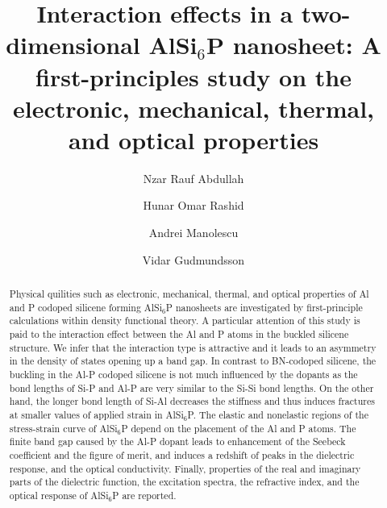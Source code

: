 \documentclass[5p,twocolumn]{elsarticle}
\begin{document}
\begin{frontmatter}




\title{Interaction effects in a two-dimensional AlSi$_6$P nanosheet: A first-principles study on the electronic, mechanical, thermal, and optical properties}
	


\author[a1,a2]{Nzar Rauf Abdullah}
\address[a1]{Division of Computational Nanoscience, Physics Department, College of Science, University of Sulaimani, Sulaimani 46001, Kurdistan Region, Iraq}
\address[a2]{Computer Engineering Department, College of Engineering, Komar University of Science and Technology, Sulaimani 46001, Kurdistan Region, Iraq}


\author[a1]{Hunar Omar Rashid}

\author[a3]{Andrei Manolescu}
\address[a3]{Reykjavik University, School of Science and Engineering, Menntavegur 1, IS-101 Reykjavik, Iceland}

\author[a4]{Vidar Gudmundsson}
\address[a4]{Science Institute, University of Iceland, Dunhaga 3, IS-107 Reykjavik, Iceland}


\begin{abstract}

Physical quilities such as electronic, mechanical, thermal, and optical properties of Al and P codoped silicene forming AlSi$_6$P nanosheets are investigated by first-principle calculations within density functional theory. A particular attention of this study is paid to the interaction effect between the Al and P atoms in the buckled silicene structure. We infer that the interaction type is attractive and it leads to an asymmetry in the density of states opening up a band gap. In contrast to BN-codoped silicene, the buckling in the Al-P codoped silicene is not much influenced by the dopants as the bond lengths of Si-P and Al-P are very similar to the Si-Si bond lengths. 
%
On the other hand, the longer bond length of Si-Al decreases the stiffness and thus induces fractures at smaller values of applied strain in AlSi$_6$P. The elastic and nonelastic regions of the stress-strain curve of AlSi$_6$P depend on the placement of the Al and P atoms.
%
The finite band gap caused by the Al-P dopant leads to enhancement of the Seebeck coefficient and the figure of merit, and induces a redshift of peaks in the dielectric response, and the optical conductivity. Finally, properties of the real and imaginary parts of the dielectric function, the excitation spectra, the refractive index, and the optical response of AlSi$_6$P are reported.   
\end{abstract}



\end{frontmatter}
\end{document}

